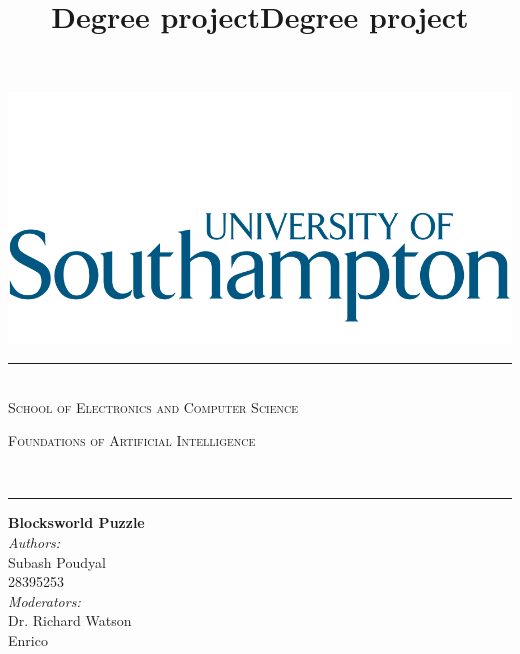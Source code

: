 \documentclass[10pt]{article}
\title{Degree project}
\title{Degree project}
\begin{document}

\thispagestyle{firststyle}
\begin{center}
  \begin{minipage}{0.48\textwidth} \begin{center}
      \includegraphics[scale = 0.95]{images/default-logo.png}
  \end{center}
    
\end{minipage}
  \vspace*{3cm}
  \vspace*{1cm}
  
\rule{\linewidth}{0.9pt}  \\[1.4cm]
\vspace*{-1cm}
  \textsc{\LARGE School of Electronics and Computer Science}\\[1.5cm]

  \begin{minipage}{0.9\textwidth} 
    \begin{center}
      \textsc{\LARGE Foundations of Artificial Intelligence}
    \end{center}
  \end{minipage}\\[0.5cm]
  \rule{\linewidth}{0.9pt} 
  \vspace*{1cm}

  { \huge \bfseries Blocksworld Puzzle}\\[0.4cm]	
  \vspace*{2cm}
  { \large 
    \emph{Authors:} \\	
      Subash Poudyal \\
      28395253 \\
    \vspace*{1.5cm}
    \emph{Moderators:} \\													  
      Dr. Richard Watson \\
      Enrico	\\
  }


  \vspace{3cm} 	

  
\end{center}
																		
\end{document}

